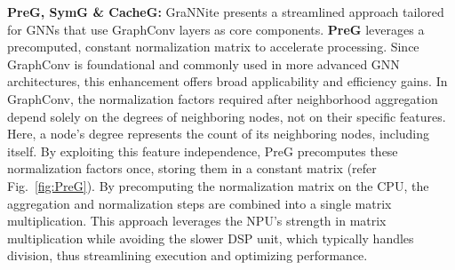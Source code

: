 \textbf{PreG, SymG \& CacheG:} GraNNite presents a streamlined approach tailored for GNNs that use GraphConv layers as core components. \textbf{PreG} leverages a precomputed, constant normalization matrix to accelerate processing. Since GraphConv is foundational and commonly used in more advanced GNN architectures, this enhancement offers broad applicability and efficiency gains. 
In GraphConv, the normalization factors required after neighborhood aggregation depend solely on the degrees of neighboring nodes, not on their specific features. Here, a node's degree represents the count of its neighboring nodes, including itself. By exploiting this feature independence, PreG precomputes these normalization factors once, storing them in a constant matrix (refer Fig.~\ref{fig:PreG}). By precomputing the normalization matrix on the CPU, the aggregation and normalization steps are combined into a single matrix multiplication. This approach leverages the NPU’s strength in matrix multiplication while avoiding the slower DSP unit, which typically handles division, thus streamlining execution and optimizing performance. 
